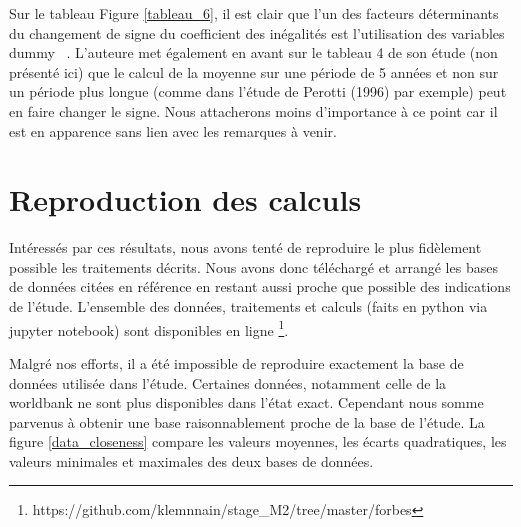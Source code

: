 \documentclass[11pt,a4paper]{article}
\begin{document}
Sur le tableau Figure \ref{tableau_6}, il est clair que l'un des facteurs déterminants du changement de signe du coefficient des inégalités est l'utilisation des variables \og dummy \fg~. L'auteure met également en avant sur le tableau 4 de son étude (non présenté ici) que le calcul de la moyenne sur une période de 5 années et non sur un période plus longue (comme dans l'étude de Perotti (1996) \cite{perotti} par exemple) peut en faire changer le signe. Nous attacherons moins d'importance à ce point car il est en apparence sans lien avec les remarques à venir. 


\section{Reproduction des calculs}

Intéressés par ces résultats, nous avons tenté de reproduire le plus fidèlement possible les traitements décrits. Nous avons donc téléchargé et arrangé les bases de données citées en référence en restant aussi proche que possible des indications de l'étude. L'ensemble des données, traitements et calculs (faits en python via jupyter notebook) sont disponibles en ligne \footnote{https://github.com/klemnnain/stage_M2/tree/master/forbes}. 

Malgré nos efforts, il a été impossible de  reproduire exactement la base de données utilisée dans l'étude. Certaines données, notamment celle de la worldbank ne sont plus disponibles dans l'état exact. Cependant nous somme parvenus à obtenir une base raisonnablement proche de la base de l'étude. La figure \ref{data_closeness} compare les valeurs moyennes, les écarts quadratiques, les valeurs minimales et maximales des deux bases de données.
\end{document}
